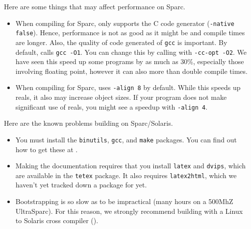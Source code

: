 
Here are some things that may affect performance on Sparc.
\begin{itemize}

\item
When compiling for Sparc, {\mlton} only supports the C code generator
({\tt -native false}).  Hence, performance is not as good as it might
be and compile times are longer.  Also, the quality of code generated
of {\tt gcc} is important.  By default, {\mlton} calls {\tt gcc -O1}.
You can change this by calling {\mlton} with {\tt -cc-opt -O2}.  We
have seen this speed up some programs by as much as 30\%, especially
those involving floating point, however it can also more than double
compile times.

\item
When compiling for Sparc, {\mlton} uses {\tt -align 8} by default.
While this speeds up reals, it also may increase object sizes.  If
your program does not make significant use of reals, you might see a
speedup with {\tt -align 4}.

\end{itemize}
Here are the known problems building {\mlton} on Sparc/Solaris.

\begin{itemize}

\item You must install the {\tt binutils}, {\tt gcc}, and {\tt make}
packages.  You can find out how to get these at
.

\item Making the documentation requires that you install {\tt latex}
and {\tt dvips}, which are available in the {\tt tetex} package.  It
also requires {\tt latex2html}, which we haven't yet tracked down a
package for yet.

\item Bootstrapping is so slow as to be impractical (many hours on a
500MhZ UltraSparc).  For this reason, we strongly recommend building
with a Linux to Solaris cross compiler ().

\end{itemize}
